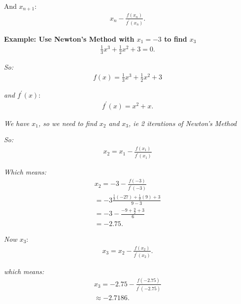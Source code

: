 \documentclass{report}
\begin{document}
  \bigbreak \noindent \bigbreak \noindent 
  And $x_{n+1}$:
  \begin{align*}
    x_n - \frac{f(x_n)}{f^{\prime}(x_n)}
  .\end{align*}

  \pagebreak \bigbreak \noindent
  \begin{mdframed}
    \textbf{Example: Use Newton's Method with $x_1 = -3$ to find $x_3 $}
    \begin{align*}
      \frac{1}{3}x^{3}+\frac{1}{2}x^{2}+3 = 0
    .\end{align*}
  \end{mdframed} 

  \bigbreak \noindent
  \textit{So:}
  \begin{align*}
    f(x) =\frac{1}{3}x^{3} + \frac{1}{2}x^{2} + 3
  \end{align*}

  \bigbreak \noindent 
  \textit{and $f^{\prime}(x)$}:
  \begin{align*}
    f^{\prime}(x) = x^{2} + x
  .\end{align*}

  \bigbreak \noindent  \bigbreak \noindent 
  \textit{We have $x_1$, so we need to find $x_2$ and $x_3$, ie 2 iterations of Newton's Method}

  \bigbreak \noindent
  \textit{So:}
  \begin{align*}
    x_2 = x_1 - \frac{f(x_1)}{f^{\prime}(x_1)}
  \end{align*}

  \bigbreak \noindent 
  \textit{Which means:}
  \begin{align*}
    x_2 = -3 - \frac{f(-3)}{f^{\prime}(-3)} \\
    = -3 \frac{\frac{1}{3}(-27)+\frac{1}{2}(9)+3}{9-3} \\
    = -3 - \frac{-9 + \frac{9}{2}+3}{6} \\
    = -2.75
  .\end{align*}

  \bigbreak \noindent 
  \textit{Now $x_3 $}:
  \begin{align*}
    x_3 = x_2 - \frac{f(x_2)}{f^{\prime}(x_2)}
  .\end{align*}

  \bigbreak \noindent 
  \textit{which means:}
  \begin{align*}
    x_3 = -2.75 - \frac{f(-2.75)}{f^{\prime}(-2.75)} \\
    \approx -2.7186
  .\end{align*}
\end{document}
